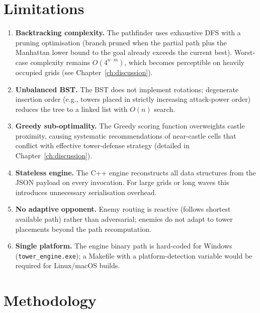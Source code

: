 \documentclass[12pt,a4paper]{report}
\begin{document}
\chapter{Limitations}
\label{ch:limitations}

\begin{enumerate}
  \item \textbf{Backtracking complexity.}
        The pathfinder uses exhaustive DFS with a pruning optimisation
        (branch pruned when the partial path plus the Manhattan lower bound
        to the goal already exceeds the current best).
        Worst-case complexity remains $O(4^{n \cdot m})$, which becomes
        perceptible on heavily occupied grids (see Chapter~\ref{ch:discussion}).
  \item \textbf{Unbalanced BST.}
        The BST does not implement rotations; degenerate insertion order
        (e.g., towers placed in strictly increasing attack-power order) reduces
        the tree to a linked list with $O(n)$ search.
  \item \textbf{Greedy sub-optimality.}
        The Greedy scoring function overweights castle proximity, causing
        systematic recommendations of near-castle cells that conflict with
        effective tower-defense strategy (detailed in
        Chapter~\ref{ch:discussion}).
  \item \textbf{Stateless engine.}
        The C++ engine reconstructs all data structures from the JSON payload
        on every invocation. For large grids or long waves this introduces
        unnecessary serialisation overhead.
  \item \textbf{No adaptive opponent.}
        Enemy routing is reactive (follows shortest available path) rather
        than adversarial; enemies do not adapt to tower placements beyond the
        path recomputation.
  \item \textbf{Single platform.}
        The engine binary path is hard-coded for Windows
        (\texttt{tower\_engine.exe}); a Makefile with a platform-detection
        variable would be required for Linux/macOS builds.
\end{enumerate}

\chapter{Methodology}
\label{ch:methodology}
\end{document}
